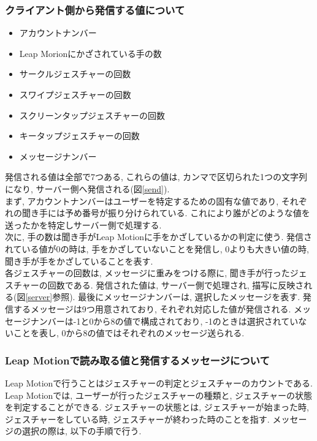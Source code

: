 \documentclass{funthesis}
\begin{document}

\subsubsection{クライアント側から発信する値について}

\begin{itemize}
 \item アカウントナンバー
 \item Leap Morionにかざされている手の数
 \item サークルジェスチャーの回数
 \item スワイプジェスチャーの回数
  \item スクリーンタップジェスチャーの回数
 \item キータップジェスチャーの回数
 \item  メッセージナンバー
\end{itemize}

発信される値は全部で7つある, これらの値は, カンマで区切られた1つの文字列になり, サーバー側へ発信される(図\ref{send}).\\ 
まず, アカウントナンバーはユーザーを特定するための固有な値であり, それぞれの聞き手には予め番号が振り分けられている. これにより誰がどのような値を送ったかを特定しサーバー側で処理する. \\
次に, 手の数は聞き手がLeap Motionに手をかざしているかの判定に使う. 発信されている値が0の時は, 手をかざしていないことを発信し, 0よりも大きい値の時, 聞き手が手をかざしていることを表す. \\
各ジェスチャーの回数は, メッセージに重みをつける際に, 聞き手が行ったジェスチャーの回数である. 発信された値は, サーバー側で処理され, 描写に反映される(図\ref{server}参照). 
最後にメッセージナンバーは, 選択したメッセージを表す. 発信するメッセージは9つ用意されており, それぞれ対応した値が発信される. メッセージナンバーは-1と0から8の値で構成されており, -1のときは選択されていないことを表し, 0から8の値ではそれぞれのメッセージ送られる. \\

\subsubsection{Leap Motionで読み取る値と発信するメッセージについて}
Leap Motionで行うことはジェスチャーの判定とジェスチャーのカウントである.  Leap Motionでは, ユーザーが行ったジェスチャーの種類と, ジェスチャーの状態を判定することができる. ジェスチャーの状態とは, ジェスチャーが始まった時, ジェスチャーをしている時, ジェスチャーが終わった時のことを指す. メッセージの選択の際は, 以下の手順で行う. 
\end{document}
